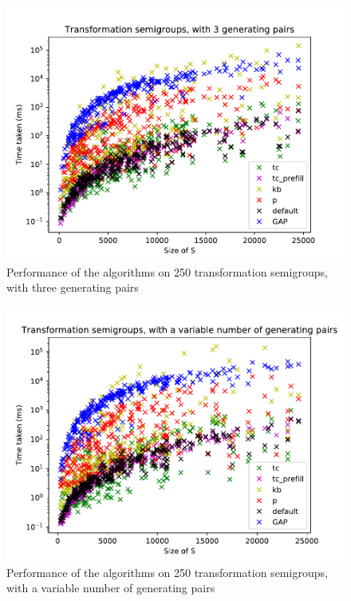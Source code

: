 \begin{figure}[h]
  \centering
  \includegraphics[width=\textwidth]{pics/ch-pairs/bench-trans-3p-times}
  \caption{Performance of the algorithms on 250 transformation semigroups, with
    three generating pairs}
  \label{fig:bench-trans-3p-times}
\end{figure}

\begin{figure}[h]
  \centering
  \includegraphics[width=\textwidth]{pics/ch-pairs/bench-trans-vp-times}
  \caption{Performance of the algorithms on 250 transformation semigroups, with
    a variable number of generating pairs}
  \label{fig:bench-trans-vp-times}
\end{figure}

